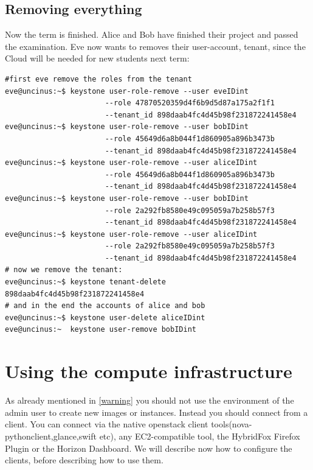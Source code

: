 \documentclass[a4paper,bibtotoc,english,liststotoc]{scrartcl}
\begin{document}
\subsection{Removing everything}
\label{sec:removing-everything}
Now the term is finished. Alice and Bob have finished their project and
passed the examination. Eve now wants to removes their user-account,
tenant, since the Cloud will be needed for new students next term:
\begin{verbatim}
#first eve remove the roles from the tenant
eve@uncinus:~$ keystone user-role-remove --user eveIDint    
                       --role 47870520359d4f6b9d5d87a175a2f1f1 
                       --tenant_id 898daab4fc4d45b98f231872241458e4
eve@uncinus:~$ keystone user-role-remove --user bobIDint    
                       --role 45649d6a8b044f1d860905a896b3473b 
                       --tenant_id 898daab4fc4d45b98f231872241458e4
eve@uncinus:~$ keystone user-role-remove --user aliceIDint  
                       --role 45649d6a8b044f1d860905a896b3473b 
                       --tenant_id 898daab4fc4d45b98f231872241458e4
eve@uncinus:~$ keystone user-role-remove --user bobIDint    
                       --role 2a292fb8580e49c095059a7b258b57f3 
                       --tenant_id 898daab4fc4d45b98f231872241458e4
eve@uncinus:~$ keystone user-role-remove --user aliceIDint  
                       --role 2a292fb8580e49c095059a7b258b57f3 
                       --tenant_id 898daab4fc4d45b98f231872241458e4
# now we remove the tenant:
eve@uncinus:~$ keystone tenant-delete  898daab4fc4d45b98f231872241458e4
# and in the end the accounts of alice and bob
eve@uncinus:~$ keystone user-delete aliceIDint
eve@uncinus:~  keystone user-remove bobIDint
\end{verbatim}

\section{Using the compute infrastructure}
\label{sec:using-comp-infr}

As already mentioned in \ref{warning} you should not use
the environment of the admin user to create new images or
instances. Instead you should connect from a client. You can connect
via the native openstack client tools(nova-pythonclient,glance,swift etc), any EC2-compatible tool, the HybridFox
Firefox Plugin or the Horizon Dashboard. We will describe now how to
configure the clients, before describing how to use them.\\
\end{document}
